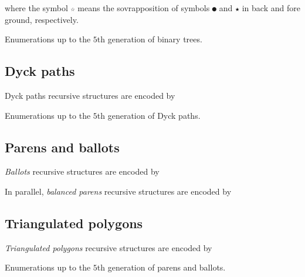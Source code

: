 \begin{margintable}
where the symbol \verb|☆| means the sovrapposition of symbols \verb|●| and
\verb|★| in back and fore ground, respectively.
\caption{Enumerations up to the $5$th generation of binary trees.}
\end{margintable}

\subsection{Dyck paths}

Dyck paths recursive structures are encoded by


\begin{margintable}
\caption{Enumerations up to the $5$th generation of Dyck paths.}
\end{margintable}

\subsection{Parens and ballots}

\textit{Ballots} recursive structures are encoded by



In parallel, \textit{balanced parens} recursive structures are encoded by


\newpage
\subsection{Triangulated polygons}

\textit{Triangulated polygons} recursive structures are encoded by

\begin{margintable}
\caption{Enumerations up to the $5$th generation of parens and ballots.}
\end{margintable}

